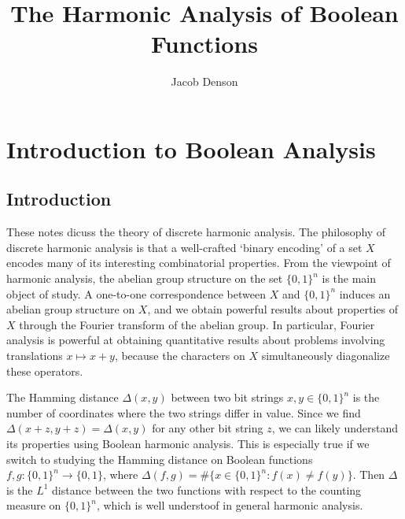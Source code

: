 

\title{The Harmonic Analysis of Boolean Functions}
\author{Jacob Denson}




\maketitle

\tableofcontents


\chapter{Introduction to Boolean Analysis}

\section{Introduction}

These notes dicuss the theory of discrete harmonic analysis. The philosophy of discrete harmonic analysis is that a well-crafted `binary encoding' of a set $X$ encodes many of its interesting combinatorial properties. From the viewpoint of harmonic analysis, the abelian group structure on the set $\{ 0,1 \}^n$ is the main object of study. A one-to-one correspondence between $X$ and $\{ 0,1 \}^n$ induces an abelian group structure on $X$, and we obtain powerful results about properties of $X$ through the Fourier transform of the abelian group. In particular, Fourier analysis is powerful at obtaining quantitative results about problems involving translations $x \mapsto x  +y$, because the characters on $X$ simultaneously diagonalize these operators.

\begin{example}
    The Hamming distance $\Delta(x,y)$ between two bit strings $x, y \in \{ 0, 1 \}^n$ is the number of coordinates where the two strings differ in value. Since we find $\Delta(x + z, y + z) = \Delta(x,y)$ for any other bit string $z$, we can likely understand its properties using Boolean harmonic analysis. This is especially true if we switch to studying the Hamming distance on Boolean functions $f,g: \{ 0,1 \}^n \to \{ 0, 1 \}$, where $\Delta(f,g) = \# \{ x \in \{ 0, 1 \}^n : f(x) \neq f(y) \}$. Then $\Delta$ is the $L^1$ distance between the two functions with respect to the counting measure on $\{ 0, 1 \}^n$, which is well understoof in general harmonic analysis.
\end{example}

